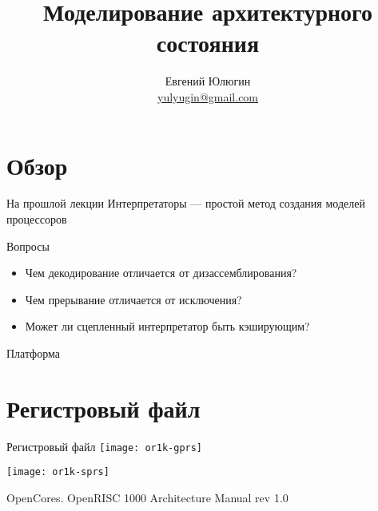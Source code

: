 

\title{Моделирование архитектурного состояния}
\author[Евгений Юлюгин]{Евгений Юлюгин \\ \small{\href{mailto:yulyugin@gmail.com}{yulyugin@gmail.com}}}



\begin{frame}
    \maketitle
\end{frame}

\begin{frame}
    \tableofcontents
\end{frame}

\section*{Обзор}

\begin{frame}{На прошлой лекции}
Интерпретаторы — простой метод создания моделей процессоров

\end{frame}

\begin{frame}{Вопросы}
\begin{itemize}
\item Чем декодирование отличается от дизассемблирования? \pause
\item Чем прерывание отличается от исключения? \pause
\item Может ли сцепленный интерпретатор быть кэширующим?
\end{itemize}

\end{frame}


\begin{frame}{Платформа}
\centering
\vfill
{}
\vfill

\end{frame}

\section{Регистровый файл}

\begin{frame}{Регистровый файл}
\centering
\texttt{[image: or1k-gprs]}

\texttt{[image: or1k-sprs]}

\tiny{OpenCores. OpenRISC 1000 Architecture Manual rev 1.0}
\end{frame}


